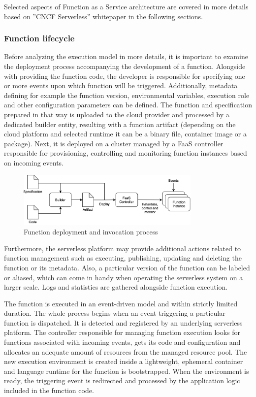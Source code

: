 Selected aspects of Function as a Service architecture are covered in more details based on ''CNCF Serverless'' whitepaper \cite{CNCFServerless} in the following sections.

\subsubsection{Function lifecycle}

Before analyzing the execution model in more details, it is important to examine the deployment process accompanying the development of a function. Alongside with providing the function code, the developer is responsible for specifying one or more events upon which function will be triggered. Additionally, metadata defining for example the function version, environmental variables, execution role and other configuration parameters can be defined. The function and specification prepared in that way is uploaded to the cloud provider and processed by a dedicated builder entity, resulting with a function artifact (depending on the cloud platform and selected runtime it can be a binary file, container image or a package). Next, it is deployed on a cluster managed by a FaaS controller responsible for provisioning, controlling and monitoring function instances based on incoming events.

\begin{figure}[h]
    \centering
    \includegraphics[width=0.8\textwidth]{assets/02-serverless/ServerlessDeployment.png}
    \caption{Function deployment and invocation process}
    \label{fig:function-deployment-and-invocation-process}
\end{figure}

Furthermore, the serverless platform may provide additional actions related to function management such as executing, publishing, updating and deleting the function or its metadata. Also, a particular version of the function can be labeled or aliased, which can come in handy when operating the serverless system on a larger scale. Logs and statistics are gathered alongside function execution.

The function is executed in an event-driven model and within strictly limited duration. The whole process begins when an event triggering a particular function is dispatched. It is detected and registered by an underlying serverless platform. The controller responsible for managing function execution looks for functions associated with incoming events, gets its code and configuration and allocates an adequate amount of resources from the managed resource pool. The new execution environment is created inside a lightweight, ephemeral container and language runtime for the function is bootstrapped. When the environment is ready, the triggering event is redirected and processed by the application logic included in the function code.

